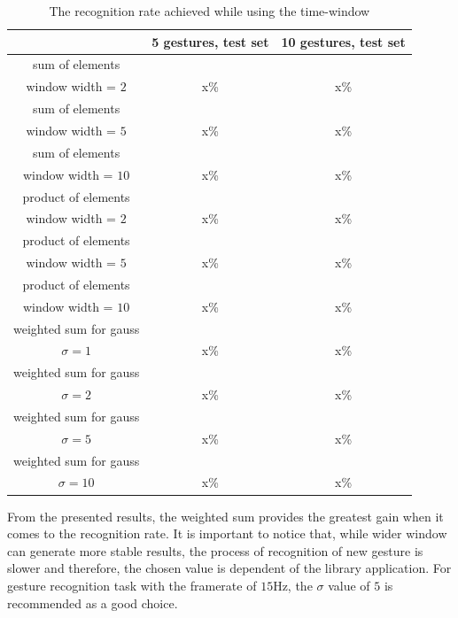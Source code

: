 \begin{table}[htp!]
\begin{center}
	\label{staticcom}
	\caption{The recognition rate achieved while using the time-window}
    \begin{tabular}{|c|c|c|}
    \hline
   ~ &  5 gestures, test set &  10 gestures, test set \\ \hline
    sum of elements  & &  \\ 
    window width = $2$ & x\% & x\%  \\ \hline
    sum of elements & & \\ 
    window width = $5$  & x\% & x\%   \\ \hline
    sum of elements & & \\ 
    window width = $10$  & x\% & x\%   \\ \hline
    product of elements & &\\ 
    window width = $2$ & x\% & x\% \\ \hline
    product of elements & & \\ 
    window width = $5$ & x\% & x\% \\ \hline
    product of elements & & \\ 
    window width = $10$ & x\% & x\% \\ \hline
    weighted sum for gauss & & \\ 
    $\sigma = 1$ & x\% & x\% \\ \hline
    weighted sum for gauss & & \\ 
    $\sigma = 2$ & x\% & x\% \\ \hline
    weighted sum for gauss & &\\ 
    $\sigma = 5$ & x\% & x\% \\ \hline
    weighted sum for gauss & &\\ 
    $\sigma = 10$ & x\% & x\% \\ \hline
    \end{tabular}
    \end{center}
\end{table}

From the presented results, the weighted sum provides the greatest gain when it comes to the recognition rate. 
It is important to notice that, while wider window can generate more stable results, the process of recognition of new gesture is slower and therefore, the chosen value is dependent of the library application.
For gesture recognition task with the framerate of $15$Hz, the $\sigma$ value of $5$ is recommended as a good choice.


